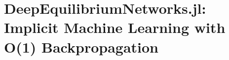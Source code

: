 \chapter{DeepEquilibriumNetworks.jl: Implicit Machine Learning with O(1) Backpropagation}
\label{chapter:deep_equilibrium_networks_software}